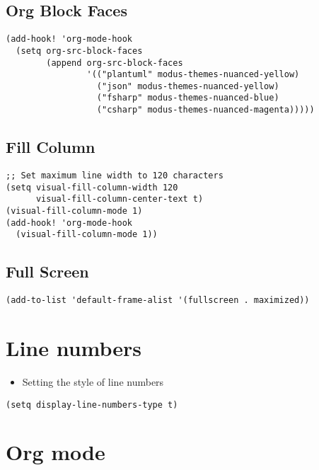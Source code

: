\documentclass[11pt]{article}
\begin{document}
\subsection{Org Block Faces}
\label{sec:orgf2670d5}

\begin{verbatim}
(add-hook! 'org-mode-hook
  (setq org-src-block-faces
        (append org-src-block-faces
                '(("plantuml" modus-themes-nuanced-yellow)
                  ("json" modus-themes-nuanced-yellow)
                  ("fsharp" modus-themes-nuanced-blue)
                  ("csharp" modus-themes-nuanced-magenta)))))
\end{verbatim}
\subsection{Fill Column}
\label{sec:org679ecbb}
\begin{verbatim}
;; Set maximum line width to 120 characters
(setq visual-fill-column-width 120
      visual-fill-column-center-text t)
(visual-fill-column-mode 1)
(add-hook! 'org-mode-hook
  (visual-fill-column-mode 1))

\end{verbatim}
\subsection{Full Screen}
\label{sec:org8fd00a1}

\begin{verbatim}
(add-to-list 'default-frame-alist '(fullscreen . maximized))
\end{verbatim}
\section{Line numbers}
\label{sec:org7d36e6f}

\begin{itemize}
\item Setting the style of line numbers
\end{itemize}
\begin{verbatim}
(setq display-line-numbers-type t)
\end{verbatim}
\section{Org mode}
\label{sec:orgcaccd11}
\end{document}
